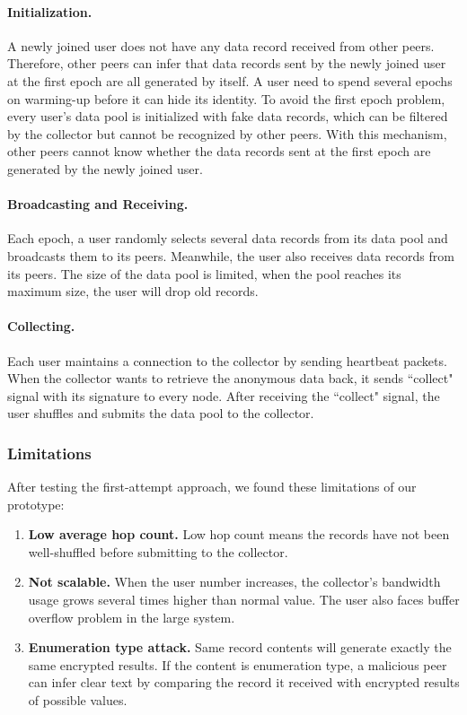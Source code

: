 \documentclass[twocolumn]{article}
\begin{document}
\paragraph{Initialization.} A newly joined user does not have any data record received from other peers. Therefore, other peers can infer that data records sent by the newly joined user at the first epoch are all generated by itself. A user need to spend several epochs on warming-up before it can hide its identity. To avoid the first epoch problem, every user's data pool is initialized with fake data records, which can be filtered by the collector but cannot be recognized by other peers. With this mechanism, other peers cannot know whether the data records sent at the first epoch are generated by the newly joined user.
\paragraph{Broadcasting and Receiving.} Each epoch, a user randomly selects several data records from its data pool and broadcasts them to its peers. Meanwhile, the user also receives data records from its peers. The size of the data pool is limited, when the pool reaches its maximum size, the user will drop old records.
\paragraph{Collecting.} Each user maintains a connection to the collector by sending heartbeat packets. When the collector wants to retrieve the anonymous data back, it sends ``collect" signal with its signature to every node. After receiving the ``collect" signal, the user shuffles and submits the data pool to the collector.

\subsubsection{Limitations}
After testing the first-attempt approach, we found these limitations of our prototype:
\begin{enumerate}[label=(\roman*)]
    \item \textbf{Low average hop count.} Low hop count means the records have not been well-shuffled before submitting to the collector.
    
    \item \textbf{Not scalable.} When the user number increases, the collector's bandwidth usage grows several times higher than normal value. The user also faces buffer overflow problem in the large system.
    
    \item \textbf{Enumeration type attack.} Same record contents will generate exactly the same encrypted results. If the content is enumeration type, a malicious peer can infer clear text by comparing the record it received with encrypted results of possible values.
\end{enumerate}
\end{document}
